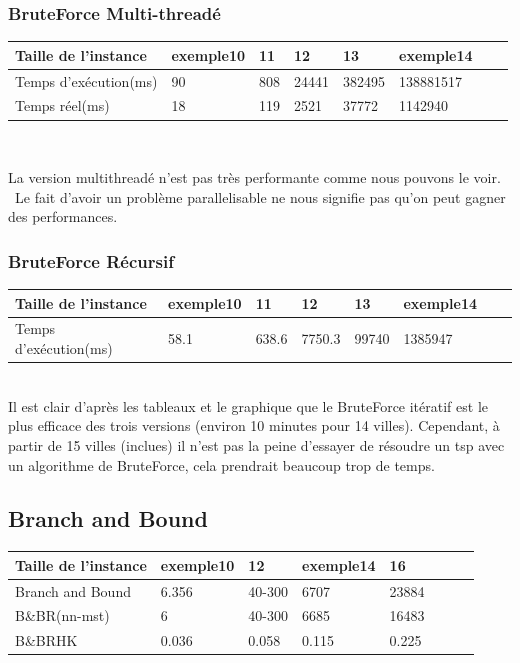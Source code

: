\documentclass[12pt]{report}
\begin{document}
{{{{{{{\subsubsection{BruteForce Multi-threadé}

\begin{tabular}{|l|l|l|l|l|l|l|l|}
	\hline 
	 Taille de l'instance &exemple10 &11 &12 &13 &exemple14  \\ \hline
 	 Temps d'exécution(ms) &90 &808 &24441 &382495 &138881517 \\ \hline
     Temps réel(ms) & 18 &119 &2521 & 37772 & 1142940\\ \hline
\end{tabular} \\
\newline

La version multithreadé n'est pas très performante comme nous pouvons le voir. \
Le fait d'avoir un problème parallelisable ne nous signifie pas qu'on peut gagner des performances.

\subsubsection{BruteForce Récursif}
\begin{tabular}{|l|l|l|l|l|l|l|l|}
	\hline 
    Taille de l'instance &exemple10 &11 &12 &13 &exemple14  \\ \hline
    Temps d'exécution(ms) &58.1 &638.6 &7750.3 &99740 &1385947 \\ \hline
\end{tabular}\\
\newline
Il est clair d'après les tableaux et le graphique que le BruteForce itératif est le plus efficace des trois versions (environ 10 minutes pour 14 villes). Cependant, à partir de 15 villes (inclues) il n'est pas la peine d'essayer de résoudre un tsp avec un algorithme de BruteForce, cela prendrait beaucoup trop de temps.


\subsection{Branch and Bound}

\begin{tabular}{|l|l|l|l|l|l|l|l|}
	\hline 
	 Taille de l'instance &exemple10 &12 &exemple14 &16 \\ \hline
     Branch and Bound &6.356 &40-300 & 6707 &23884\\ \hline
     B\&BR(nn-mst) &6 &40-300 &6685 &16483\\ \hline
     B\&BRHK &0.036 &0.058 &0.115 &0.225\\ \hline
     

\end{tabular}}}}}}}}
\end{document}
